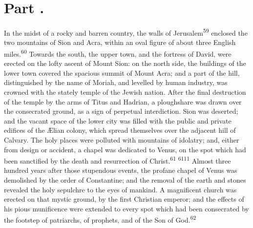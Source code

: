 


\section{Part \thesection.}

In the midst of a rocky and barren country, the walls of
Jerusalem\textsuperscript{59} enclosed the two mountains of Sion and Acra, within
an oval figure of about three English miles.\textsuperscript{60} Towards the
south, the upper town, and the fortress of David, were erected on
the lofty ascent of Mount Sion: on the north side, the buildings
of the lower town covered the spacious summit of Mount Acra; and
a part of the hill, distinguished by the name of Moriah, and
levelled by human industry, was crowned with the stately temple
of the Jewish nation. After the final destruction of the temple
by the arms of Titus and Hadrian, a ploughshare was drawn over
the consecrated ground, as a sign of perpetual interdiction. Sion
was deserted; and the vacant space of the lower city was filled
with the public and private edifices of the Ælian colony, which
spread themselves over the adjacent hill of Calvary. The holy
places were polluted with mountains of idolatry; and, either from
design or accident, a chapel was dedicated to Venus, on the spot
which had been sanctified by the death and resurrection of
Christ.\textsuperscript{61} \textsuperscript{6111} Almost three hundred years after those stupendous
events, the profane chapel of Venus was demolished by the order
of Constantine; and the removal of the earth and stones revealed
the holy sepulchre to the eyes of mankind. A magnificent church
was erected on that mystic ground, by the first Christian
emperor; and the effects of his pious munificence were extended
to every spot which had been consecrated by the footstep of
patriarchs, of prophets, and of the Son of God.\textsuperscript{62}



